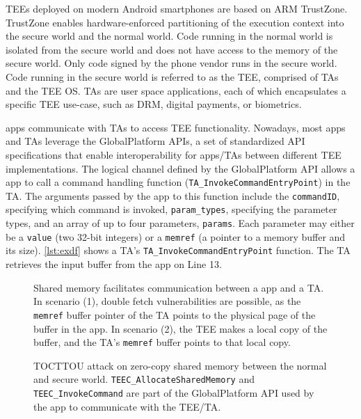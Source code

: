 \documentclass[conference]{IEEEtran}
\begin{document}
TEEs deployed on modern Android smartphones are based on ARM TrustZone. 
TrustZone enables hardware-enforced partitioning of the execution context into 
the secure world and the normal world. Code running in the normal world is isolated 
from the secure world and does not 
have access to the memory of the secure world. Only code signed by the phone 
vendor runs in the secure world. Code running in the secure world is referred 
to as the TEE, comprised of TAs and the TEE OS. TAs are user space applications, 
each of which encapsulates a specific TEE use-case, such as DRM, digital 
payments, or biometrics.

apps communicate with TAs to access TEE functionality. Nowadays, most apps and TAs 
leverage the GlobalPlatform APIs, a set of standardized API specifications that enable 
interoperability for apps/TAs between different TEE implementations. The logical 
channel defined by the GlobalPlatform API allows a app to call a command handling 
function (\texttt{TA\_InvokeCommandEntryPoint}) in the TA.  
The arguments passed by the app to this function include the \texttt{commandID}, specifying 
which command is invoked, \texttt{param\_types}, specifying the parameter types, 
and an array of up to four parameters, \texttt{params}. 
Each parameter may either be a \texttt{value} (two 32-bit integers) or a 
\texttt{memref} (a pointer to a memory buffer and its size). 
\autoref{lst:exdf} shows a TA's \texttt{TA\_InvokeCommandEntryPoint} function.
The TA retrieves the input buffer from the app on Line 13.

\begin{figure}[h]
  \centering
  
  \caption{
    Shared memory facilitates communication between a app and a TA.
    In scenario (1), double fetch vulnerabilities are possible, as the \texttt{memref} 
    buffer pointer of the TA points to the physical page of the buffer in the app. 
    In scenario (2), the TEE makes a local copy of the buffer, and the TA's \texttt{memref} buffer 
    points to that local copy.
    }
  \label{fig:shmex}
\end{figure}
\begin{figure}[h]
  \centering
  
  \caption{
    TOCTTOU attack on zero-copy shared memory between the normal and secure world.
    \texttt{TEEC\_AllocateSharedMemory} and \texttt{TEEC\_InvokeCommand} are part of the GlobalPlatform 
    API used by the app to communicate with the TEE/TA.
    }
  \label{fig:tocttouex}
\end{figure}
\end{document}
